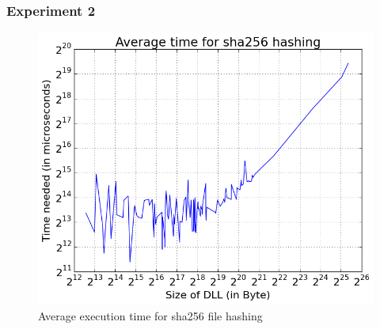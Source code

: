 \subsubsection{Experiment 2}
\begin{figure}[h]
	\centering
    \includegraphics[width=\textwidth,height=0.45\textheight,keepaspectratio]{Evaluation/experiment2/result.png}
    \caption{Average execution time for sha256 file hashing}
    \label{fig:ex2_result}
\end{figure}
